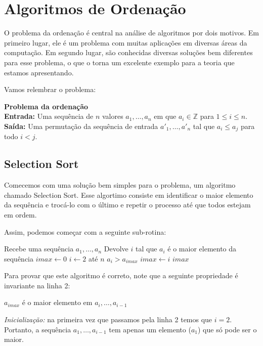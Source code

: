 \chapter{Algoritmos de Ordenação}

O problema da ordenação é central na análise de algoritmos por dois motivos.
Em primeiro lugar, ele é um problema com muitas aplicações em diversas áreas da computação.
Em segundo lugar, são conhecidas diversas soluções bem diferentes para esse problema, o que o torna um excelente exemplo para a teoria que estamos apresentando.

Vamos relembrar o problema:

  {\bf Problema da ordenação}\\

  {\bf Entrada:} Uma sequência de $n$ valores $a_1, \dots, a_n$ em que $a_i \in \mathbb{Z}$ para $1 \leq i \leq n$.\\

  {\bf Saída:} Uma permutação da sequência de entrada $a'_1, \dots, a'_n$ tal que $a_i \leq a_j$ para todo $i < j$.

  \section{Selection Sort}

  Comecemos com uma solução bem simples para o problema, um algoritmo chamado Selection Sort.
  Esse algortimo consiste em identificar o maior elemento da sequência e trocá-lo com o último e repetir o processo até que todos estejam em ordem.

  Assim, podemos começar com a seguinte sub-rotina:

  \begin{codebox}
\li \Comment Recebe uma sequência $a_1, \dots, a_n$
\li \Comment Devolve $i$ tal que $a_i$ é o maior elemento da sequência
\li $imax \gets 0$
\li \For $i \gets 2$ até $n$
\li \Do \If $a_i > a_{imax}$
\li     \Then $imax \gets i$
        \End
    \End
\li \Return $imax$
\End
  \end{codebox}

  Para provar que este algoritmo é correto, note que a seguinte propriedade é invariante na linha 2:

  \begin{center}
    $a_{imax}$ é o maior elemento em $a_i, \dots, a_{i-1}$ 
  \end{center}

  {\em Inicialização:} na primeira vez que passamos pela linha 2 temos que $i = 2$.
  Portanto, a sequência $a_1, \dots, a_{i-1}$ tem apenas um elemento ($a_1$) que só pode ser o maior.

